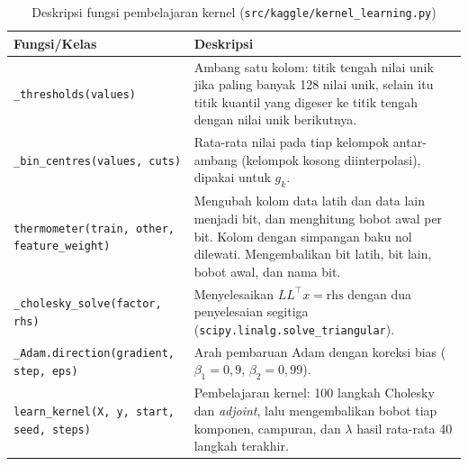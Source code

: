 \begin{table}[H]
	\centering
	\caption{Deskripsi fungsi pembelajaran kernel (\texttt{src/kaggle/kernel\_learning.py})}
	\label{tab:svm-fungsi-kl}
	\small
	\begin{tabularx}{\textwidth}{>{\raggedright\arraybackslash}p{4.8cm} Y}
		\toprule
		\textbf{Fungsi/Kelas} & \textbf{Deskripsi} \\
		\midrule
		\texttt{\_thresholds(values)} & Ambang satu kolom: titik tengah nilai unik jika paling banyak 128 nilai unik, selain itu titik kuantil yang digeser ke titik tengah dengan nilai unik berikutnya. \\
		\texttt{\_bin\_centres(values, cuts)} & Rata-rata nilai pada tiap kelompok antar-ambang (kelompok kosong diinterpolasi), dipakai untuk $g_k$. \\
		\texttt{thermometer(train, other, feature\_weight)} & Mengubah kolom data latih dan data lain menjadi bit, dan menghitung bobot awal per bit. Kolom dengan simpangan baku nol dilewati. Mengembalikan bit latih, bit lain, bobot awal, dan nama bit. \\
		\texttt{\_cholesky\_solve(factor, rhs)} & Menyelesaikan $LL^{\top}x = \text{rhs}$ dengan dua penyelesaian segitiga (\texttt{scipy.linalg.solve\_triangular}). \\
		\texttt{\_Adam.direction(gradient, step, eps)} & Arah pembaruan Adam \cite{kingma2015adam} dengan koreksi bias ($\beta_1 = 0{,}9$, $\beta_2 = 0{,}99$). \\
		\texttt{learn\_kernel(X, y, start, seed, steps)} & Pembelajaran kernel: 100 langkah Cholesky dan \textit{adjoint}, lalu mengembalikan bobot tiap komponen, campuran, dan $\lambda$ hasil rata-rata 40 langkah terakhir. \\
		\bottomrule
	\end{tabularx}
\end{table}

